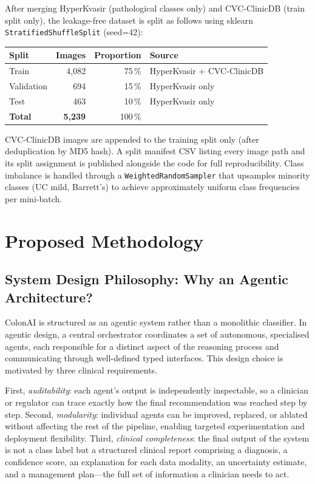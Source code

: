 \documentclass[conference]{IEEEtran}
\begin{document}
After merging HyperKvasir (pathological classes only) and CVC-ClinicDB
(train split only), the leakage-free dataset is split as follows using
sklearn \texttt{StratifiedShuffleSplit} (seed=42):

\begin{center}
\small
\begin{tabular}{lrrl}
\toprule
\textbf{Split} & \textbf{Images} & \textbf{Proportion} & \textbf{Source}\\\midrule
Train      & 4,082 & 75\,\% & HyperKvasir + CVC-ClinicDB\\
Validation &   694 & 15\,\% & HyperKvasir only\\
Test       &   463 & 10\,\% & HyperKvasir only\\\midrule
\textbf{Total} & \textbf{5,239} & 100\,\% & \\\bottomrule
\end{tabular}
\end{center}

CVC-ClinicDB images are appended to the training split only (after
deduplication by MD5 hash). A split manifest CSV listing every image path
and its split assignment is published alongside the code for full
reproducibility. Class imbalance is handled through a
\texttt{WeightedRandomSampler} that upsamples minority classes (UC mild,
Barrett's) to achieve approximately uniform class frequencies per mini-batch.

\section{Proposed Methodology}
\label{sec:method}

\subsection{System Design Philosophy: Why an Agentic Architecture?}

ColonAI is structured as an agentic system rather than a monolithic classifier.
In agentic design, a central orchestrator coordinates a set of autonomous,
specialised agents, each responsible for a distinct aspect of the reasoning
process and communicating through well-defined typed interfaces. This design
choice is motivated by three clinical requirements.

First, \emph{auditability}: each agent's output is independently inspectable,
so a clinician or regulator can trace exactly how the final recommendation was
reached step by step.
Second, \emph{modularity}: individual agents can be improved, replaced, or
ablated without affecting the rest of the pipeline, enabling targeted
experimentation and deployment flexibility.
Third, \emph{clinical completeness}: the final output of the system is not
a class label but a structured clinical report comprising a diagnosis, a
confidence score, an explanation for each data modality, an uncertainty
estimate, and a management plan---the full set of information a clinician
needs to act.
\end{document}
